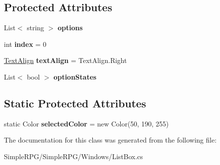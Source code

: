 \subsection*{Protected Attributes}
\begin{DoxyCompactItemize}
\item 
\hypertarget{class_simple_r_p_g_1_1_windows_1_1_list_box_a92c83b7cef9c2dfc6a73d7eff0452f4b}{List$<$ string $>$ {\bfseries options}}\label{class_simple_r_p_g_1_1_windows_1_1_list_box_a92c83b7cef9c2dfc6a73d7eff0452f4b}

\item 
\hypertarget{class_simple_r_p_g_1_1_windows_1_1_list_box_a297d8960ed0e02cfc6ec17667eb6ffe7}{int {\bfseries index} = 0}\label{class_simple_r_p_g_1_1_windows_1_1_list_box_a297d8960ed0e02cfc6ec17667eb6ffe7}

\item 
\hypertarget{class_simple_r_p_g_1_1_windows_1_1_list_box_acca590bb773b0dd119b704005d9f451d}{\hyperlink{namespace_simple_r_p_g_a956c6a011833191ccb1b0aa38a1d5916}{Text\-Align} {\bfseries text\-Align} = Text\-Align.\-Right}\label{class_simple_r_p_g_1_1_windows_1_1_list_box_acca590bb773b0dd119b704005d9f451d}

\item 
\hypertarget{class_simple_r_p_g_1_1_windows_1_1_list_box_a9b580e3991f944c314e1cdd874ea65dc}{List$<$ bool $>$ {\bfseries option\-States}}\label{class_simple_r_p_g_1_1_windows_1_1_list_box_a9b580e3991f944c314e1cdd874ea65dc}

\end{DoxyCompactItemize}
\subsection*{Static Protected Attributes}
\begin{DoxyCompactItemize}
\item 
\hypertarget{class_simple_r_p_g_1_1_windows_1_1_list_box_a794905b5eec11a6f002b162c4a135266}{static Color {\bfseries selected\-Color} = new Color(50, 190, 255)}\label{class_simple_r_p_g_1_1_windows_1_1_list_box_a794905b5eec11a6f002b162c4a135266}

\end{DoxyCompactItemize}


The documentation for this class was generated from the following file\-:\begin{DoxyCompactItemize}
\item 
Simple\-R\-P\-G/\-Simple\-R\-P\-G/\-Windows/List\-Box.\-cs\end{DoxyCompactItemize}
